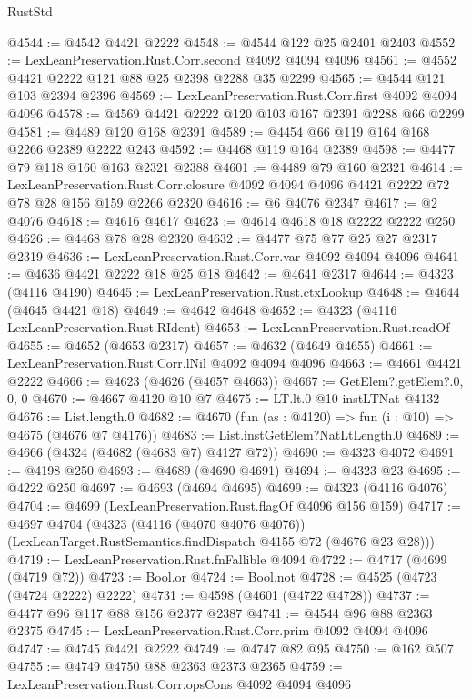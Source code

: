 \begin{lexlean}{RustStd}
\begin{coremodule}
{\begin{coremodule}
{{{{{{{{{{{{{{@4544 := @4542 @4421 @2222
@4548 := @4544 @122 @25 @2401 @2403
@4552 := LexLeanPreservation.Rust.Corr.second @4092 @4094 @4096
@4561 := @4552 @4421 @2222 @121 @88 @25 @2398 @2288 @35 @2299
@4565 := @4544 @121 @103 @2394 @2396
@4569 := LexLeanPreservation.Rust.Corr.first @4092 @4094 @4096
@4578 := @4569 @4421 @2222 @120 @103 @167 @2391 @2288 @66 @2299
@4581 := @4489 @120 @168 @2391
@4589 := @4454 @66 @119 @164 @168 @2266 @2389 @2222 @243
@4592 := @4468 @119 @164 @2389
@4598 := @4477 @79 @118 @160 @163 @2321 @2388
@4601 := @4489 @79 @160 @2321
@4614 := LexLeanPreservation.Rust.Corr.closure
    @4092
    @4094
    @4096
    @4421
    @2222
    @72
    @78
    @28
    @156
    @159
    @2266
    @2320
@4616 := @6 @4076 @2347
@4617 := @2 @4076
@4618 := @4616 @4617
@4623 := @4614 @4618 @18 @2222 @2222 @250
@4626 := @4468 @78 @28 @2320
@4632 := @4477 @75 @77 @25 @27 @2317 @2319
@4636 := LexLeanPreservation.Rust.Corr.var @4092 @4094 @4096
@4641 := @4636 @4421 @2222 @18 @25 @18
@4642 := @4641 @2317
@4644 := @4323 (@4116 @4190)
@4645 := LexLeanPreservation.Rust.ctxLookup
@4648 := @4644 (@4645 @4421 @18)
@4649 := @4642 @4648
@4652 := @4323 (@4116 LexLeanPreservation.Rust.RIdent)
@4653 := LexLeanPreservation.Rust.readOf
@4655 := @4652 (@4653 @2317)
@4657 := @4632 (@4649 @4655)
@4661 := LexLeanPreservation.Rust.Corr.lNil @4092 @4094 @4096
@4663 := @4661 @4421 @2222
@4666 := @4623 (@4626 (@4657 @4663))
@4667 := GetElem?.getElem?.{0, 0, 0}
@4670 := @4667 @4120 @10 @7
@4675 := LT.lt.{0} @10 instLTNat @4132
@4676 := List.length.{0}
@4682 := @4670 (fun (as : @4120) => fun (i : @10) => @4675 (@4676 @7 @4176))
@4683 := List.instGetElem?NatLtLength.{0}
@4689 := @4666 (@4324 (@4682 (@4683 @7) @4127 @72))
@4690 := @4323 @4072
@4691 := @4198 @250
@4693 := @4689 (@4690 @4691)
@4694 := @4323 @23
@4695 := @4222 @250
@4697 := @4693 (@4694 @4695)
@4699 := @4323 (@4116 @4076)
@4704 := @4699 (LexLeanPreservation.Rust.flagOf @4096 @156 @159)
@4717 := @4697
    @4704
    (@4323
      (@4116 (@4070 @4076 @4076))
      (LexLeanTarget.RustSemantics.findDispatch @4155 @72 (@4676 @23 @28)))
@4719 := LexLeanPreservation.Rust.fnFallible @4094
@4722 := @4717 (@4699 (@4719 @72))
@4723 := Bool.or
@4724 := Bool.not
@4728 := @4525 (@4723 (@4724 @2222) @2222)
@4731 := @4598 (@4601 (@4722 @4728))
@4737 := @4477 @96 @117 @88 @156 @2377 @2387
@4741 := @4544 @96 @88 @2363 @2375
@4745 := LexLeanPreservation.Rust.Corr.prim @4092 @4094 @4096
@4747 := @4745 @4421 @2222
@4749 := @4747 @82 @95
@4750 := @162 @507
@4755 := @4749 @4750 @88 @2363 @2373 @2365
@4759 := LexLeanPreservation.Rust.Corr.opsCons @4092 @4094 @4096
}}}}}}}}}}}}}}
\end{coremodule}}
\end{coremodule}
\end{lexlean}

